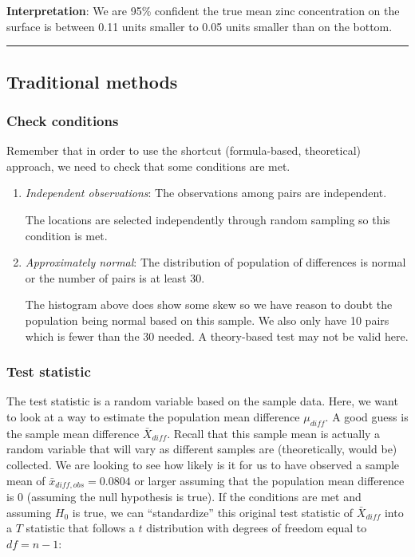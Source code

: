 \documentclass[12pt, krantz2,]{krantz}
\begin{document}
\textbf{Interpretation}: We are 95\% confident the true mean zinc concentration on the surface is between 0.11 units smaller to 0.05 units smaller than on the bottom.

\begin{center}\rule{0.5\linewidth}{\linethickness}\end{center}

\hypertarget{traditional-methods-4}{%
\subsection{Traditional methods}\label{traditional-methods-4}}

\hypertarget{check-conditions-4}{%
\subsubsection*{Check conditions}\label{check-conditions-4}}


Remember that in order to use the shortcut (formula-based, theoretical) approach, we need to check that some conditions are met.

\begin{enumerate}
\def\labelenumi{\arabic{enumi}.}
\item
  \emph{Independent observations}: The observations among pairs are independent.

  The locations are selected independently through random sampling so this condition is met.
\item
  \emph{Approximately normal}: The distribution of population of differences is normal or the number of pairs is at least 30.

  The histogram above does show some skew so we have reason to doubt the population being normal based on this sample. We also only have 10 pairs which is fewer than the 30 needed. A theory-based test may not be valid here.
\end{enumerate}

\hypertarget{test-statistic-4}{%
\subsubsection*{Test statistic}\label{test-statistic-4}}


The test statistic is a random variable based on the sample data. Here, we want to look at a way to estimate the population mean difference \(\mu_{diff}\). A good guess is the sample mean difference \(\bar{X}_{diff}\). Recall that this sample mean is actually a random variable that will vary as different samples are (theoretically, would be) collected. We are looking to see how likely is it for us to have observed a sample mean of \(\bar{x}_{diff, obs} = 0.0804\) or larger assuming that the population mean difference is 0 (assuming the null hypothesis is true). If the conditions are met and assuming \(H_0\) is true, we can ``standardize'' this original test statistic of \(\bar{X}_{diff}\) into a \(T\) statistic that follows a \(t\) distribution with degrees of freedom equal to \(df = n - 1\):
\end{document}

